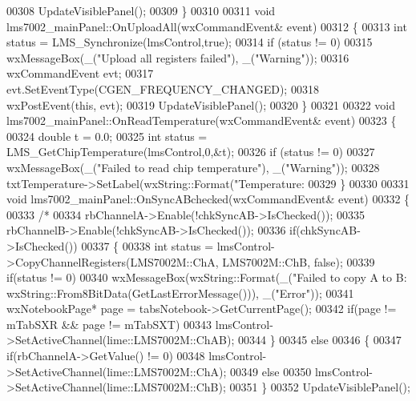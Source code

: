 \begin{DoxyCode}
00308     UpdateVisiblePanel();
00309 \}
00310 
00311 \textcolor{keywordtype}{void} lms7002_mainPanel::OnUploadAll(wxCommandEvent& event)
00312 \{
00313     \textcolor{keywordtype}{int} status = LMS_Synchronize(lmsControl,\textcolor{keyword}{true});
00314     \textcolor{keywordflow}{if} (status != 0)
00315         wxMessageBox(\_(\textcolor{stringliteral}{"Upload all registers failed"}), \_(\textcolor{stringliteral}{"Warning"}));
00316     wxCommandEvent evt;
00317     evt.SetEventType(CGEN\_FREQUENCY\_CHANGED);
00318     wxPostEvent(\textcolor{keyword}{this}, evt);
00319     UpdateVisiblePanel();
00320 \}
00321 
00322 \textcolor{keywordtype}{void} lms7002_mainPanel::OnReadTemperature(wxCommandEvent& event)
00323 \{
00324     \textcolor{keywordtype}{double} t = 0.0;
00325     \textcolor{keywordtype}{int} status = LMS_GetChipTemperature(lmsControl,0,&t);
00326     \textcolor{keywordflow}{if} (status != 0)
00327         wxMessageBox(\_(\textcolor{stringliteral}{"Failed to read chip temperature"}), \_(\textcolor{stringliteral}{"Warning"}));
00328     txtTemperature->SetLabel(wxString::Format(\textcolor{stringliteral}{"Temperature: %
00329 \}
00330 
00331 \textcolor{keywordtype}{void} lms7002_mainPanel::OnSyncABchecked(wxCommandEvent& event)
00332 \{
00333     \textcolor{comment}{/*}
00334 \textcolor{comment}{    rbChannelA->Enable(!chkSyncAB->IsChecked());}
00335 \textcolor{comment}{    rbChannelB->Enable(!chkSyncAB->IsChecked());}
00336 \textcolor{comment}{    if(chkSyncAB->IsChecked())}
00337 \textcolor{comment}{    \{}
00338 \textcolor{comment}{        int status = lmsControl->CopyChannelRegisters(LMS7002M::ChA, LMS7002M::ChB, false);}
00339 \textcolor{comment}{        if(status != 0)}
00340 \textcolor{comment}{            wxMessageBox(wxString::Format(\_("Failed to copy A to B: %
       wxString::From8BitData(GetLastErrorMessage())), \_("Error"));}
00341 \textcolor{comment}{        wxNotebookPage* page = tabsNotebook->GetCurrentPage();}
00342 \textcolor{comment}{        if(page != mTabSXR && page != mTabSXT)}
00343 \textcolor{comment}{            lmsControl->SetActiveChannel(lime::LMS7002M::ChAB);}
00344 \textcolor{comment}{    \}}
00345 \textcolor{comment}{    else}
00346 \textcolor{comment}{    \{}
00347 \textcolor{comment}{        if(rbChannelA->GetValue() != 0)}
00348 \textcolor{comment}{            lmsControl->SetActiveChannel(lime::LMS7002M::ChA);}
00349 \textcolor{comment}{        else}
00350 \textcolor{comment}{            lmsControl->SetActiveChannel(lime::LMS7002M::ChB);}
00351 \textcolor{comment}{    \}}
00352 \textcolor{comment}{    UpdateVisiblePanel();}
}
\end{DoxyCode}
